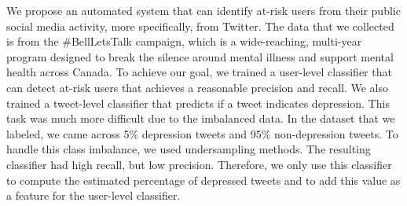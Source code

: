 We propose an automated system that can identify at-risk users from their public social media activity, more specifically, from Twitter. The data that we collected is from the \#BellLetsTalk campaign, which is a wide-reaching, multi-year program designed to break the silence around mental illness and support mental health across Canada. To achieve our goal, we trained a user-level classifier that can detect at-risk users that achieves a reasonable precision and recall. We also trained a tweet-level classifier that predicts if a tweet indicates depression. This task was much more difficult due to the imbalanced data. In the dataset that we labeled, we came across 5\% depression tweets and 95\% non-depression tweets. To handle this class imbalance, we used undersampling methods. The resulting classifier had high recall, but low precision. Therefore, we only use this classifier to compute the estimated percentage of depressed tweets and to add this value as a feature for the user-level classifier.
